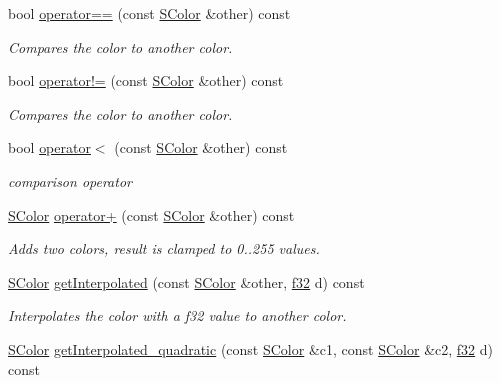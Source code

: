 \begin{DoxyCompactItemize}
\item 
bool \hyperlink{classirr_1_1video_1_1SColor_a68025038ef1c75c8b7ca64270216f79f}{operator==} (const \hyperlink{classirr_1_1video_1_1SColor}{S\+Color} \&other) const 
\begin{DoxyCompactList}\small\item\em Compares the color to another color. \end{DoxyCompactList}\item 
bool \hyperlink{classirr_1_1video_1_1SColor_abcacfc84b1a87f148570efb176999104}{operator!=} (const \hyperlink{classirr_1_1video_1_1SColor}{S\+Color} \&other) const 
\begin{DoxyCompactList}\small\item\em Compares the color to another color. \end{DoxyCompactList}\item 
bool \hyperlink{classirr_1_1video_1_1SColor_a8e7944ddc658076a2933861a1b99f1e7}{operator$<$} (const \hyperlink{classirr_1_1video_1_1SColor}{S\+Color} \&other) const 
\begin{DoxyCompactList}\small\item\em comparison operator \end{DoxyCompactList}\item 
\hyperlink{classirr_1_1video_1_1SColor}{S\+Color} \hyperlink{classirr_1_1video_1_1SColor_a1cd25e0e67050af13a15515b7d2c8782}{operator+} (const \hyperlink{classirr_1_1video_1_1SColor}{S\+Color} \&other) const 
\begin{DoxyCompactList}\small\item\em Adds two colors, result is clamped to 0..255 values. \end{DoxyCompactList}\item 
\hyperlink{classirr_1_1video_1_1SColor}{S\+Color} \hyperlink{classirr_1_1video_1_1SColor_a880760bf37e7c2143cc0b1a0e90a85b1}{get\+Interpolated} (const \hyperlink{classirr_1_1video_1_1SColor}{S\+Color} \&other, \hyperlink{namespaceirr_a0277be98d67dc26ff93b1a6a1d086b07}{f32} d) const 
\begin{DoxyCompactList}\small\item\em Interpolates the color with a f32 value to another color. \end{DoxyCompactList}\item 
\hyperlink{classirr_1_1video_1_1SColor}{S\+Color} \hyperlink{classirr_1_1video_1_1SColor_a9e3832dd71062d1d200f11b91cd3a104}{get\+Interpolated\+\_\+quadratic} (const \hyperlink{classirr_1_1video_1_1SColor}{S\+Color} \&c1, const \hyperlink{classirr_1_1video_1_1SColor}{S\+Color} \&c2, \hyperlink{namespaceirr_a0277be98d67dc26ff93b1a6a1d086b07}{f32} d) const 

\end{DoxyCompactItemize}
